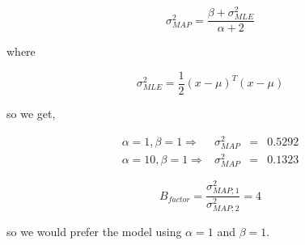 \documentclass{article}
\begin{document}
\begin{equation}
\sigma^2_{MAP}=\frac{\beta+\sigma^2_{MLE}}{\alpha+2}
\end{equation}

where

\begin{equation}
\sigma^2_{MLE}=\frac{1}{2}\left(x-\mu\right)^{T}\left(x-\mu\right)
\end{equation}


so we get,

\begin{equation}
\begin{array}{rrcl}
\alpha=1, \beta = 1 \Rightarrow & \sigma^2_{MAP} & = & 0.5292\\
\alpha=10, \beta = 1 \Rightarrow & \sigma^2_{MAP} & = & 0.1323
\end{array}
\end{equation}

\begin{equation}
B_{factor}=\frac{\sigma^2_{MAP;1}}{\sigma^2_{MAP;2}}=4
\end{equation}

so we would prefer the model using $\alpha=1$ and $\beta=1$.
\end{document}
